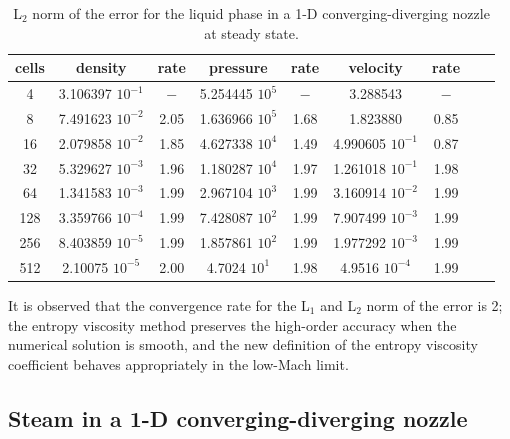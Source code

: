 %
%
\begin{table}[H]
\begin{center}
 \caption{\label{tbl:l2_norm_liq} L$_2$ norm of the error for the liquid phase in a 1-D converging-diverging nozzle at steady state.}
 \begin{tabular}{|c|c|c|c|c|c|c|c|c|}
 \hline
cells& density            & rate & pressure          & rate & velocity           & rate \\ \hline
4    & 3.106397 $10^{-1}$ & $-$  & 5.254445 $10^{5}$ & $-$  & 3.288543           & $-$  \\ \hline
8    & 7.491623 $10^{-2}$ & 2.05 & 1.636966 $10^{5}$ & 1.68 & 1.823880           & 0.85 \\ \hline
16   & 2.079858 $10^{-2}$ & 1.85 & 4.627338 $10^{4}$ & 1.49 & 4.990605 $10^{-1}$ & 0.87 \\ \hline
32   & 5.329627 $10^{-3}$ & 1.96 & 1.180287 $10^{4}$ & 1.97 & 1.261018 $10^{-1}$ & 1.98 \\ \hline
64   & 1.341583 $10^{-3}$ & 1.99 & 2.967104 $10^{3}$ & 1.99 & 3.160914 $10^{-2}$ & 1.99 \\ \hline
128  & 3.359766 $10^{-4}$ & 1.99 & 7.428087 $10^{2}$ & 1.99 & 7.907499 $10^{-3}$ & 1.99 \\ \hline
256  & 8.403859 $10^{-5}$ & 1.99 & 1.857861 $10^{2}$ & 1.99 & 1.977292 $10^{-3}$ & 1.99 \\ \hline
512  & 2.10075  $10^{-5}$ & 2.00 & 4.7024   $10^{1}$ & 1.98 & 4.9516   $10^{-4}$ & 1.99 \\ \hline
\end{tabular}
\end{center}
\end{table}
It is observed that the convergence rate for the L$_1$ and L$_2$ norm of the error is 2; the entropy viscosity method preserves the high-order accuracy when the numerical solution is smooth, and the new definition of the entropy viscosity coefficient behaves appropriately in the low-Mach limit.
%
\subsection{Steam in a 1-D converging-diverging nozzle} \label{sec:steam_nozzle}

